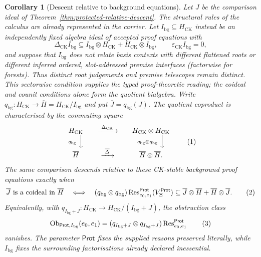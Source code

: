 \documentclass[10pt,a4paper]{article}
\theoremstyle{plain}
\newtheorem{corollary}[theorem]{Corollary}
\theoremstyle{definition}
\theoremstyle{remark}
\newcommand{\HCK}{H_{\mathrm{CK}}}
\newcommand{\DeltaCK}{\Delta_{\mathrm{CK}}}
\newcommand{\epsCK}{\varepsilon_{\mathrm{CK}}}
\newcommand{\eqtag}{\refstepcounter{equation}\tag{\theequation}}
\begin{document}
\begin{corollary}[Descent relative to background equations]
\label{cor:background-relative-descent}
Let \(J\) be the comparison ideal of
Theorem~\ref{thm:protected-relative-descent}.
The structural rules of the calculus are already represented in the
carrier.  Let \(I_{\mathrm{bg}}\subseteq\HCK\) instead be an independently fixed algebra
ideal of accepted proof equations with
\[
 \DeltaCK I_{\mathrm{bg}}
   \subseteq I_{\mathrm{bg}}\otimes\HCK
       +\HCK\otimes I_{\mathrm{bg}},
 \qquad \epsCK I_{\mathrm{bg}}=0,
\]
and suppose that \(I_{\mathrm{bg}}\) does not relate basis contexts with different
flattened roots or different inferred ordered, slot-addressed premise
interfaces (factorwise for forests).  Thus distinct root judgements and
premise telescopes remain distinct.  This sectorwise condition supplies
the typed proof-theoretic reading; the
coideal and counit conditions alone form the quotient bialgebra.  Write
\(q_{\mathrm{bg}}:\HCK\to\overline H=\HCK/I_{\mathrm{bg}}\) and put
\(\overline J=q_{\mathrm{bg}}(J)\).
The quotient coproduct is characterised by the commuting square
\[
\begin{array}{c@{\qquad}c@{\qquad}c}
\HCK & \xrightarrow{\ \DeltaCK\ } & \HCK\otimes\HCK\\
\scriptstyle q_{\mathrm{bg}}\ \Big\downarrow
&&
\scriptstyle q_{\mathrm{bg}}\otimes q_{\mathrm{bg}}\ \Big\downarrow\\
\overline H & \xrightarrow{\ \overline\Delta\ }&
\overline H\otimes\overline H .
\end{array}
\eqtag\label{eq:background-quotient-square}
\]
The same comparison descends relative to these CK-stable background proof
equations exactly when
\[
 \overline J\text{ is a coideal in }\overline H
 \quad\Longleftrightarrow\quad
 (q_{\mathrm{bg}}\otimes q_{\mathrm{bg}})
    \operatorname{Res}_{e_0,e_1}^{\mathsf{Prot}}
       (V_\Xi^{\mathsf{Prot}})
 \subseteq
 \overline J\otimes\overline H+\overline H\otimes\overline J .
\eqtag\label{eq:background-relative-coideal}
\]
Equivalently, with
\(q_{I_{\mathrm{bg}}+J}:\HCK\to\HCK/(I_{\mathrm{bg}}+J)\), the obstruction class
\[
 \operatorname{Ob}_{\mathsf{Prot},I_{\mathrm{bg}}}(e_0,e_1)
   =(q_{I_{\mathrm{bg}}+J}\otimes q_{I_{\mathrm{bg}}+J})
        \operatorname{Res}_{e_0,e_1}^{\mathsf{Prot}}
\eqtag\label{eq:protected-obstruction-class}
\]
vanishes.  The parameter \(\mathsf{Prot}\) fixes the supplied reasons preserved
literally, while \(I_{\mathrm{bg}}\) fixes the surrounding factorisations already
declared inessential.
\end{corollary}
\end{document}
